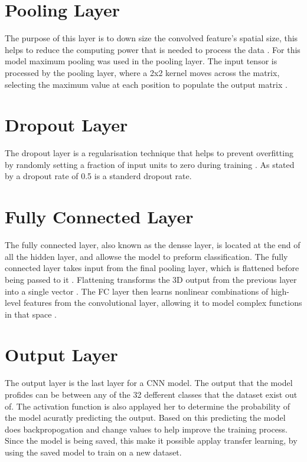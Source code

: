 \documentclass[a4paper,oneside,11pt]{book}
\begin{document}
\section{Pooling Layer}

The purpose of this layer is to down size the convolved feature's spatial size, this helps to reduce the computing power that is needed to process the data \citep{bhatt2021cnn}. For this model maximum pooling was used in the pooling layer. The input tensor is processed by the pooling layer, where a 2x2 kernel moves across the matrix, selecting the maximum value at each position to populate the output matrix \citep{bhatt2021cnn}.

\section{Dropout Layer}

The dropout layer is a regularisation technique that helps to prevent overfitting by randomly setting a fraction of input units to zero during training \citep{khan2019regularization}. As stated by \cite{khan2019regularization} a dropout rate of 0.5 is a standerd dropout rate.

\section{Fully Connected Layer}

The fully connected layer, also known as the densse layer, is located at the end of all the hidden layer, and allowse the model to preform classification. The fully connected layer takes input from the final pooling layer, which is flattened before being passed to it \citep{bhatt2021cnn}. Flattening transforms the 3D output from the previous layer into a single vector \citep{bhatt2021cnn}. The FC layer then learns nonlinear combinations of high-level features from the convolutional layer, allowing it to model complex functions in that space \citep{bhatt2021cnn}.

\newpage
\section{Output Layer}

The output layer is the last layer for a CNN model. The output that the model profides can be between any of the 32 defferent classes that the dataset exist out of. The activation function is also applayed her to determine the probability of the model acuratly predicting the output. Based on this predicting the model does backpropogation and change values to help improve the training process. Since the model is being saved, this make it possible applay transfer learning, by using the saved model to train on a new dataset.
\end{document}
